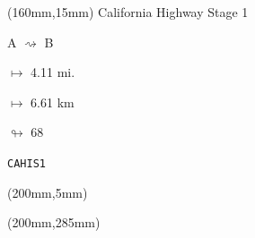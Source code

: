 \begin{textblock*}{40mm}(160mm,15mm)%
California Highway Stage 1
\par A $\rightsquigarrow$ B
\Large
\par$\mapsto$ 4.11 mi.
\par$\mapsto$ 6.61 km
\par$\looparrowright$ 68
\par\hfill\tiny\tt CAHIS1\\
\end{textblock*}
\begin{textblock*}{20mm}(200mm,5mm)%
\fbox{\thepage}
\end{textblock*}
\begin{textblock*}{20mm}(200mm,285mm)%
\fbox{\thepage}
\end{textblock*}
\null\newpage

